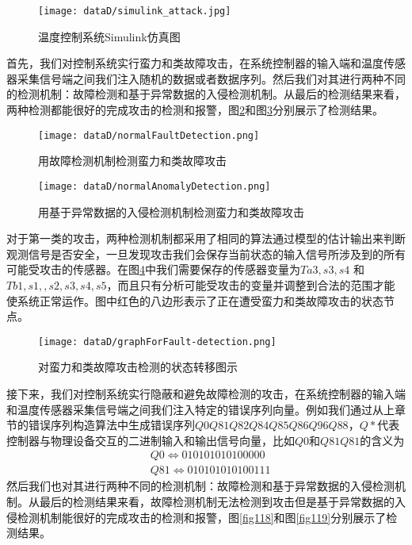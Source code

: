 	\begin{figure}[!htb]
		\centering
		\texttt{[image: dataD/simulink\_attack.jpg]}
		\caption{温度控制系统Simulink仿真图}
		\label{fig114}
	\end{figure}
	

	首先，我们对控制系统实行蛮力和类故障攻击，在系统控制器的输入端和温度传感器采集信号端之间我们注入随机的数据或者数据序列。然后我们对其进行两种不同的检测机制：故障检测和基于异常数据的入侵检测机制。从最后的检测结果来看，两种检测都能很好的完成攻击的检测和报警，图\ref{fig115}和图\ref{fig116}分别展示了检测结果。
	
	\begin{figure}[!htb]
		\centering
		\texttt{[image: dataD/normalFaultDetection.png]}
		\caption{用故障检测机制检测蛮力和类故障攻击}
		\label{fig115}
	\end{figure}
	
	\begin{figure}[!htb]
		\centering
		\texttt{[image: dataD/normalAnomalyDetection.png]}
		\caption{用基于异常数据的入侵检测机制检测蛮力和类故障攻击}
		\label{fig116}
	\end{figure}
	
	
	对于第一类的攻击，两种检测机制都采用了相同的算法通过模型的估计输出来判断观测信号是否安全，一旦发现攻击我们会保存当前状态的输入信号所涉及到的所有可能受攻击的传感器。在图\ref{fig117}中我们需要保存的传感器变量为$Ta3,s3,s4$ 和 $Tb1,s1,,s2,s3,s4,s5$，而且只有分析可能受攻击的变量并调整到合法的范围才能使系统正常运作。图中红色的八边形表示了正在遭受蛮力和类故障攻击的状态节点。
	\begin{figure}[!htb]
		\centering
		\texttt{[image: dataD/graphForFault-detection.png]}
		\caption{对蛮力和类故障攻击检测的状态转移图示}
		\label{fig117}
	\end{figure}
	

	接下来，我们对控制系统实行隐蔽和避免故障检测的攻击，在系统控制器的输入端和温度传感器采集信号端之间我们注入特定的错误序列向量。例如我们通过从上章节的错误序列构造算法中生成错误序列$Q0Q81Q82Q84Q85Q86Q96Q88$，$Q*$代表控制器与物理设备交互的二进制输入和输出信号向量，比如$Q0$和$Q81Q81$的含义为\[\begin{split}
	&Q0\Leftrightarrow 010101010100000\\
	&Q81\Leftrightarrow 010101010100111
	\end{split}
	\] 然后我们也对其进行两种不同的检测机制：故障检测和基于异常数据的入侵检测机制。从最后的检测结果来看，故障检测机制无法检测到攻击但是基于异常数据的入侵检测机制能很好的完成攻击的检测和报警，图\ref{fig118}和图\ref{fig119}分别展示了检测结果。
	
